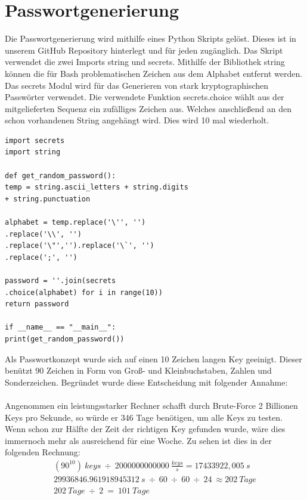 \documentclass[a4paper,11pt,singlespacing]{article}
\begin{document}
                
            
    	\section{Passwortgenerierung}
    		Die Passwortgenerierung wird mithilfe eines Python Skripts gelöst. Dieses ist in unserem GitHub Repository hinterlegt und für jeden zugänglich. Das Skript verwendet die zwei Imports string und secrets. Mithilfe der Bibliothek string können die für Bash problematischen Zeichen aus dem Alphabet entfernt werden. Das secrets Modul wird für das Generieren von stark kryptographischen Passwörter verwendet. Die verwendete Funktion secrets.choice wählt aus der mitgelieferten Sequenz ein zufälliges Zeichen aus. Welches anschließend an den schon vorhandenen String angehängt wird. Dies wird 10 mal wiederholt.
    	
    	\lstset{
    			basicstyle=\ttfamily,
    			language=Python,
    		}
    	

            \begin{lstlisting}
import secrets
import string

def get_random_password():
temp = string.ascii_letters + string.digits 
+ string.punctuation

alphabet = temp.replace('\'', '')
.replace('\\', '')
.replace('\"','').replace('\`', '')
.replace(';', '')

password = ''.join(secrets
.choice(alphabet) for i in range(10))
return password

if __name__ == "__main__":
print(get_random_password())
            \end{lstlisting}
    	
    	    	Als Passwortkonzept wurde sich auf einen 10 Zeichen langen Key geeinigt. Dieser benützt 90 Zeichen in Form von Groß- und Kleinbuchstaben, Zahlen und Sonderzeichen. Begründet wurde diese Entscheidung mit folgender Annahme: \\\\
		Angenommen ein leistungsstarker Rechner schafft durch Brute-Force 2 Billionen Keys pro Sekunde, so würde er 346 Tage benötigen, um alle Keys zu testen.  Wenn schon zur Hälfte der Zeit der richtigen Key gefunden wurde, wäre dies immernoch mehr als ausreichend für eine Woche. Zu sehen ist dies in der folgenden Rechnung:
		\begin{eqnarray}
			(90^{10})\ keys\ \div\ 2000000000000\ \frac{keys}{s} =  17433922,005\ s\\
			29936846.961918945312\ s\ \div\ 60\ \div\ 60\ \div\ 24\ \approx 202 \ Tage\\
			202\ Tage\ \div\ 2\ =\ 101\ Tage
		\end{eqnarray}\\
\end{document}
